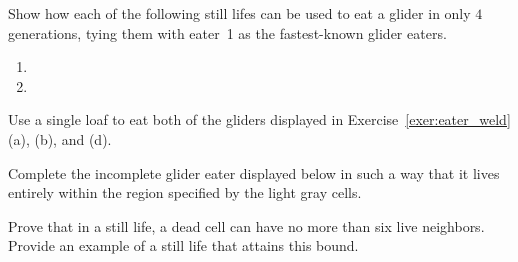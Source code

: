 \begin{multicols}{2}
	
	\mfilbreak
	
	
	\begin{problemstar}\label{exer:fast_glider_eater}
		Show how each of the following still lifes can be used to eat a glider in only $4$ generations, tying them with eater~1 as the fastest-known glider eaters.\vspace*{-0.25cm}
		
		\begin{multicols}{2}
			\begin{enumerate}
				\item[\bf\color{ocre}(a)] 
				
				\item[\bf\color{ocre}(b)] 
			\end{enumerate}
		\end{multicols}
	\end{problemstar}
	
	
	\mfilbreak
	
	
	\begin{problem}\label{exer:loaf_eater}
		Use a single loaf to eat both of the gliders displayed in Exercise~\ref{exer:eater_weld}(a), (b), and (d).
	\end{problem}
	
	
	\mfilbreak
	
	
	\begin{problemstar}\label{exer:incomplete_glider_eater}
		Complete the incomplete glider eater displayed below in such a way that it lives entirely within the region specified by the light gray cells.
		
		\begin{center}
		\end{center}
	\end{problemstar}
	
	
	\mfilbreak
	
	
	\begin{problemstar}\label{exer:still_lifes_6_neigh}
		Prove that in a still life, a dead cell can have no more than six live neighbors. Provide an example of a still life that attains this bound.
	\end{problemstar}
	

\end{multicols}
